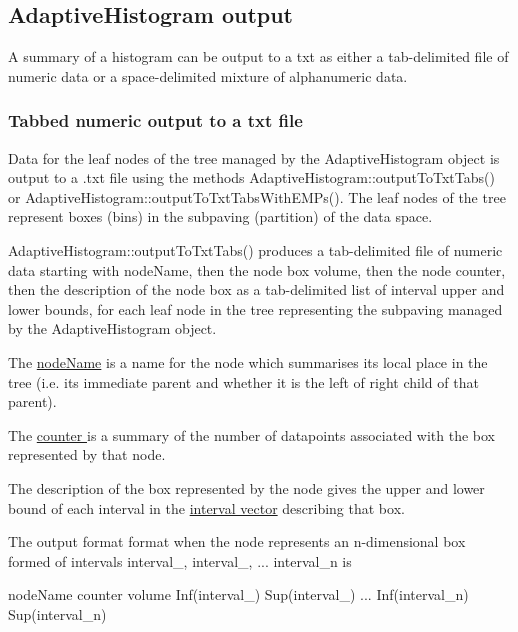 \hypertarget{AdaptiveHistograms_adhsec_output}{}\subsection{\-Adaptive\-Histogram output}\label{AdaptiveHistograms_adhsec_output}
\-A summary of a histogram can be output to a txt as either a tab-\/delimited file of numeric data or a space-\/delimited mixture of alphanumeric data.\hypertarget{AdaptiveHistograms_adhsubsec_outputtabs}{}\subsubsection{\-Tabbed numeric output to a txt file}\label{AdaptiveHistograms_adhsubsec_outputtabs}
\-Data for the leaf nodes of the tree managed by the \-Adaptive\-Histogram object is output to a .txt file using the methods \-Adaptive\-Histogram\-::output\-To\-Txt\-Tabs() or \-Adaptive\-Histogram\-::output\-To\-Txt\-Tabs\-With\-E\-M\-Ps(). \-The leaf nodes of the tree represent boxes (bins) in the subpaving (partition) of the data space.

\-Adaptive\-Histogram\-::output\-To\-Txt\-Tabs() produces a tab-\/delimited file of numeric data starting with node\-Name, then the node box volume, then the node counter, then the description of the node box as a tab-\/delimited list of interval upper and lower bounds, for each leaf node in the tree representing the subpaving managed by the \-Adaptive\-Histogram object.

\-The \hyperlink{newsubpavings_SPnodename}{node\-Name} is a name for the node which summarises its local place in the tree (i.\-e. its immediate parent and whether it is the left of right child of that parent).

\-The \hyperlink{classsubpavings_1_1SPSnode_a890b23bcab9091b420d88b99d16badc5}{counter } is a summary of the number of datapoints associated with the box represented by that node.

\-The description of the box represented by the node gives the upper and lower bound of each interval in the \hyperlink{pavproc_intervalvectors}{interval vector} describing that box.

\-The output format format when the node represents an n-\/dimensional box formed of intervals interval\-\_, interval\-\_, ... interval\-\_\-n is

node\-Name counter volume \-Inf(interval\-\_) \-Sup(interval\-\_) ... \-Inf(interval\-\_\-n) \-Sup(interval\-\_\-n)

